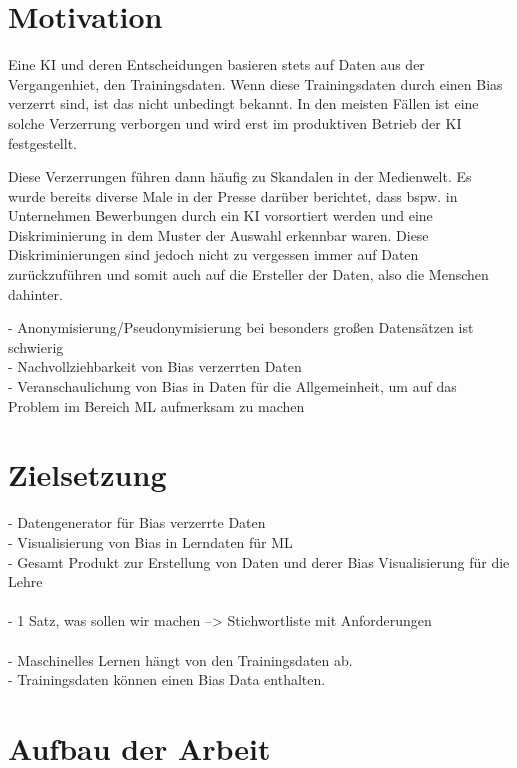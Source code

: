 \begin{onehalfspace}
        \newpage

        \section{Motivation}
        \label{subsec:motivation}
        Eine \ac*{KI} und deren Entscheidungen basieren stets auf Daten aus der Vergangenhiet, den Trainingsdaten. Wenn diese Trainingsdaten durch einen Bias verzerrt sind, ist das nicht unbedingt bekannt. In den meisten Fällen ist eine solche Verzerrung verborgen und wird erst im produktiven Betrieb der \ac*{KI} festgestellt.
        
        Diese Verzerrungen führen dann häufig zu Skandalen in der Medienwelt. Es wurde bereits diverse Male in der Presse darüber berichtet, dass bspw. in Unternehmen Bewerbungen durch ein \ac*{KI} vorsortiert werden und eine Diskriminierung in dem Muster der Auswahl erkennbar waren. Diese Diskriminierungen sind jedoch nicht zu vergessen immer auf Daten zurückzuführen und somit auch auf die Ersteller der Daten, also die Menschen dahinter.

        -	Anonymisierung/Pseudonymisierung bei besonders gro{\ss}en Datensätzen ist schwierig \\
        -	Nachvollziehbarkeit von Bias verzerrten Daten \\
        -	Veranschaulichung von Bias in Daten für die Allgemeinheit, um auf das Problem im Bereich ML aufmerksam zu machen 

        \section{Zielsetzung}
        \label{subsec:zielsetzung}
        -	Datengenerator für Bias verzerrte Daten \\
        -	Visualisierung von Bias in Lerndaten für ML \\
        -	Gesamt Produkt zur Erstellung von Daten und derer Bias Visualisierung für die Lehre \\
        \\
        -   1 Satz, was sollen wir machen --> Stichwortliste mit Anforderungen \\
        \\
        -   Maschinelles Lernen hängt von den Trainingsdaten ab.\\
        -   Trainingsdaten können einen Bias Data enthalten.\\

        \section{Aufbau der Arbeit}
        \label{subsec:aufbau der arbeit}

        \newpage

    \end{onehalfspace}